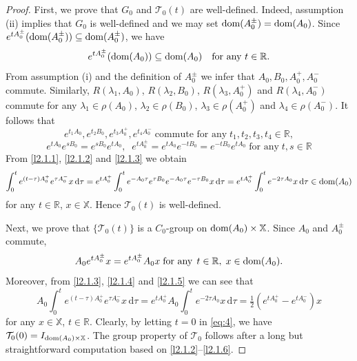 \documentclass[10pt,a4paper]{amsart}
\newcommand\R{\mathbb R}
\newcommand\bX{{\mathbb X}}
\newcommand\cT{{\mathcal T}}
\newcommand{\dom}{\text{\rm{dom}}}
\newcommand{\rmd}{{\mathrm{d}}}
\begin{document}
\begin{proof} First, we prove that $G_0$ and $\cT_0(t)$ are well-defined. Indeed, assumption (ii) implies that $G_0$ is well-defined and we may set $\dom(A_0^\pm)=\dom(A_0)$. Since $e^{tA_0^\pm}(\dom(A_0^\pm))\subseteq\dom(A_0^\pm)$, we have
\begin{equation}\label{l2.1.1}
		e^{tA_0^\pm}(\dom(A_0))\subseteq\dom(A_0)\quad\text{for any }t\in\R.
	\end{equation}
From assumption (i) and the definition of $A_0^\pm$ we infer that $A_0,B_0,A_0^+,A_0^-$ commute. Similarly, $ R(\lambda_1,A_0)$, $R(\lambda_2,B_0)$, $R(\lambda_3,A_0^+)$ and $R(\lambda_4,A_0^-)$ commute 
for any $\lambda_1\in\rho(A_0)$, $\lambda_2\in\rho(B_0)$, $\lambda_3\in\rho(A_0^+)$ and $\lambda_4\in\rho(A_0^-)$. It follows that 
	\begin{equation}\label{l2.1.2}
		e^{t_1A_0},e^{t_2B_0},e^{t_3A_0^+},e^{t_4A_0^-}\;\mbox{commute for any}\;t_1,t_2,t_3,t_4\in\R,
	\end{equation}	
	\begin{equation}\label{l2.1.3}
		e^{tA_0}e^{sB_0}=e^{sB_0}e^{tA_0},\;\;e^{tA_0^\pm}=e^{tA_0}e^{-tB_0}=e^{-tB_0}e^{tA_0}\;\mbox{for any}\; t,s\in\R
	\end{equation}	
	From \eqref{l2.1.1}, \eqref{l2.1.2} and \eqref{l2.1.3} we obtain 
	\begin{equation}\label{l2.1.4}
		\int_0^t e^{(t-\tau)A_0^+}e^{\tau A_0^-}x\,\rmd\tau
		= e^{tA_0^+}\int_0^t e^{-A_0\tau}e^{\tau B_0}e^{-A_0\tau}e^{-\tau B_0}x\,\rmd\tau=e^{tA_0^+}\int_0^t e^{-2\tau A_0}x\,\rmd\tau\in\dom(A_0)
	\end{equation}
	for any $t\in\R$, $x\in\bX$. Hence $\cT_0(t)$ is well-defined.
	
	Next, we prove that $\{\cT_0(t)\}$ is a $C_0$-group on $\dom(A_0)\times \bX$. Since $A_0$ and $A_0^\pm$ commute,
	\begin{equation}\label{l2.1.5}
		A_0 e^{tA_0^\pm}x = e^{tA_0^\pm}A_0 x\;\mbox{for any}\;\,t\in\R,\;x\in\dom(A_0).
	\end{equation}
	Moreover, from \eqref{l2.1.3}, \eqref{l2.1.4} and \eqref{l2.1.5} we can see that 
	\begin{equation}\label{l2.1.6}
		A_0\int_0^t e^{(t-\tau)A_0^+}e^{\tau A_0^-}x\,\rmd\tau
		= e^{tA_0^+}A_0\int_0^t e^{-2\tau A_0}x\,\rmd\tau
		= \tfrac{1}{2}(e^{tA_0^+}-e^{tA_0^-})x
	\end{equation}
	for any $x\in \bX$, $t\in\R$. Clearly, by letting $t=0$ in \eqref{eq:4}, we have $\cT_0(0) = I_{\dom(A_0)\times \bX}$. The group property of $\cT_0$ follows after a long but straightforward computation based on \eqref{l2.1.2}--\eqref{l2.1.6}. 
	

\end{proof}
\end{document}
